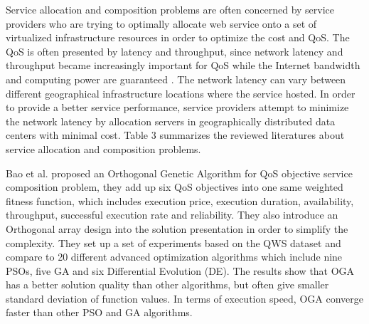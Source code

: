 \documentclass[onecolumn,10pt]{asme2ej}
\begin{document}
Service allocation and composition problems are often concerned by service providers who are trying to optimally allocate web service onto a set of virtualized infrastructure resources in order to optimize the cost and QoS. The QoS is often presented by latency and throughput, since network latency and throughput became increasingly important for QoS while the Internet bandwidth and computing power are guaranteed \cite{aboolian2009location}. The network latency can vary between different geographical infrastructure locations where the service hosted. In order to provide a better service performance, service providers attempt to minimize the network latency by allocation servers in geographically distributed data centers with minimal cost. Table 3 summarizes the reviewed literatures about service allocation and composition problems.

Bao et al. \cite{bao2016orthogonal} proposed an Orthogonal Genetic Algorithm for QoS objective service composition problem, they add up six QoS objectives into one same weighted fitness function, which includes execution price, execution duration, availability, throughput, successful execution rate and reliability. They also introduce an Orthogonal array design into the solution presentation in order to simplify the complexity. They set up a set of experiments based on the QWS dataset \cite{al2007discovering, al2008investigating} and compare to 20 different advanced optimization algorithms which include nine PSOs, five GA and six Differential Evolution (DE). The results show that OGA has a better solution quality than other algorithms, but often give smaller standard deviation of function values. In terms of execution speed, OGA converge faster than other PSO and GA algorithms. 
\end{document}
